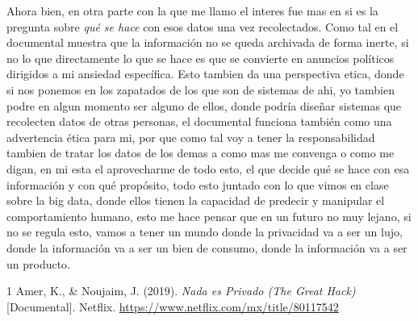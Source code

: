 \documentclass[letterpaper,11pt]{article}
\begin{document}
 
Ahora bien, en otra parte con la que me llamo el interes fue mas en si 
es la pregunta sobre \emph{qué se hace} con
esos datos una vez recolectados. 
Como tal en el documental muestra que 
la información no se queda archivada de forma inerte, si no lo que 
directamente lo que se hace es que se convierte en anuncios políticos
dirigidos a mi ansiedad específica. 
Esto tambien da una perspectiva etica, donde si nos 
ponemos en los zapatados de los que 
son de sistemas de ahi, yo tambien podre en algun 
momento ser alguno de ellos, donde podría diseñar sistemas que
recolecten datos de otras personas, 
el documental funciona también como una
advertencia ética para mi, por que como tal 
voy a tener la responsabilidad tambien de tratar los datos de los demas
a como mas me convenga o como me digan, en mi esta el
aprovecharme de todo esto, el que decide
qué se hace con esa información y con qué propósito, todo esto 
juntado con lo que vimos en clase sobre la big data, donde 
ellos tienen la capacidad de predecir y manipular el comportamiento humano,
esto me hace pensar que en un futuro no muy lejano,
si no se regula esto, vamos a tener un mundo donde
la privacidad va a ser un lujo, donde la información
va a ser un bien de consumo, donde la información va a ser
un producto.

\newpage
{}
\begin{thebibliography}{1}
Amer, K., \& Noujaim, J. (2019). \textit{Nada es Privado (The Great Hack)} [Documental]. Netflix.
\url{https://www.netflix.com/mx/title/80117542}
\end{thebibliography}
\end{document}
